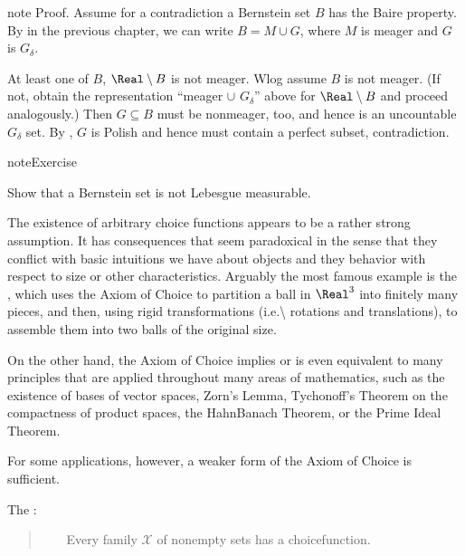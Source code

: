 \documentclass[letterpaper,10pt,english]{jupyterBook}
\begin{document}
\begin{sphinxadmonition}{note}
\sphinxAtStartPar
Proof. Assume for a contradiction a Bernstein set \(B\) has the Baire property. By {\hyperref[\detokenize{measure:exercise-bp-gdelta-plus}]{}} in the previous chapter, we can write \(B = M \cup G\), where \(M\) is meager and \(G\) is \(G_\delta\).

\sphinxAtStartPar
At least one of \(B\), \(\Real\setminus B\) is not meager. Wlog assume \(B\) is not meager. (If not, obtain the representation “meager \(\cup\) \(G_\delta\)” above for \(\Real\setminus B\) and proceed analogously.) Then \(G \subseteq B\) must be non\sphinxhyphen{}meager, too, and hence is an uncountable \(G_\delta\) set. By {\hyperref[\detokenize{subsets_Polish:thm-subsets-Polish}]{}}, \(G\) is Polish and hence must contain a perfect subset, contradiction.
\end{sphinxadmonition}

\begin{sphinxadmonition}{note}{Exercise}

\sphinxAtStartPar
Show that a Bernstein set is not Lebesgue measurable.
\end{sphinxadmonition}

\sphinxAtStartPar
The existence of arbitrary choice functions appears to be a rather strong assumption. It has consequences that seem paradoxical in the sense that they conflict with basic intuitions we have about objects and they behavior with respect to size or other characteristics. Arguably the most famous example is the , which uses the Axiom of Choice to partition a ball in \(\Real^3\) into finitely many pieces, and then, using rigid transformations (i.e.\textbackslash{} rotations and translations), to assemble them into two balls of the original size.

\sphinxAtStartPar
On the other hand, the Axiom of Choice implies or is even equivalent to many principles that are applied throughout many areas of mathematics, such as the existence of bases of vector spaces, Zorn’s Lemma, Tychonoff’s Theorem on the compactness of product spaces, the Hahn\sphinxhyphen{}Banach Theorem, or the Prime Ideal Theorem.

\sphinxAtStartPar
For some applications, however, a weaker form of the Axiom of Choice is sufficient.

\sphinxAtStartPar
The :
\begin{quote}

\sphinxAtStartPar
{}     Every  family \(\mathcal{X}\) of non\sphinxhyphen{}empty sets has a choice\sphinxhyphen{}function.
\end{quote}
\end{document}
